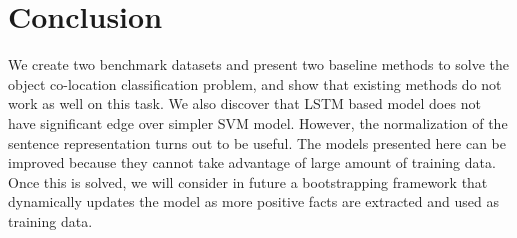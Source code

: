 \section{Conclusion}
We create two benchmark datasets and present two baseline methods to solve 
the object co-location classification problem, and show 
that existing methods do not work as well on this task. 
We also discover that LSTM based model does not have significant edge over 
simpler SVM model. However, the normalization of the sentence representation
turns out to be useful. The models presented here can be 
improved because they cannot take advantage of large amount of training
data. Once this is solved, we will consider in future a bootstrapping framework
that dynamically updates the model as more positive facts are extracted and
used as training data.
